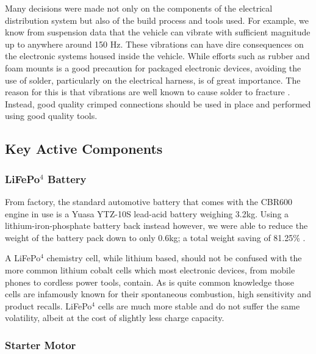 Many decisions were made not only on the components of the electrical distribution system but also of the build process and tools used.  For example, we know from suspension data that the vehicle can vibrate with sufficient magnitude up to anywhere around 150 Hz.  These vibrations can have dire consequences on the electronic systems housed inside the vehicle.  While efforts such as rubber and foam mounts is a good precaution for packaged electronic devices, avoiding the use of solder, particularly on the electrical harness, is of great importance.  The reason for this is that vibrations are well known to cause solder to fracture\cite{solder_vibrations,solder_vibrations2} .  Instead, good quality crimped connections should be used in place and performed using good quality tools.

\subsection{Key Active Components}

\subsubsection{LiFePo$^{4}$ Battery}

From factory, the standard automotive battery that comes with the CBR600 engine in use is a Yuasa YTZ-10S lead-acid battery weighing 3.2kg.  Using a lithium-iron-phosphate battery back instead however, we were able to reduce the weight of the battery pack down to only 0.6kg; a total weight saving of 81.25\% .

A LiFePo$^{4}$ chemistry cell, while lithium based, should not be confused with the more common lithium cobalt cells which most electronic devices, from mobile phones to cordless power tools, contain.  As is quite common knowledge those cells are infamously known for their spontaneous combustion, high sensitivity and product recalls.  LiFePo$^{4}$ cells are much more stable and do not suffer the same volatility, albeit at the cost of slightly less charge capacity.

\subsubsection{Starter Motor}

